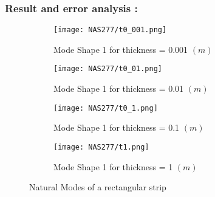 \documentclass[VM.tex]{subfiles}
\begin{document}
\subsubsection*{Result and error analysis : }
\begin{figure}[h!]
\centering
{}
\end{figure}





\begin{figure}[h!]
\centering
\begin{subfigure}{.8\textwidth}
\texttt{[image: NAS277/t0\_001.png]}
\caption{Mode Shape 1 for thickness = 0.001 $(m)$}
\end{subfigure} \vfill
\begin{subfigure}{.8\textwidth}
\texttt{[image: NAS277/t0\_01.png]}
\caption{Mode Shape 1 for thickness = 0.01 $(m)$}
\end{subfigure}\vfill
\begin{subfigure}{.8\textwidth}
\texttt{[image: NAS277/t0\_1.png]}
\caption{Mode Shape 1 for thickness = 0.1 $(m)$}
\end{subfigure}\vfill
\begin{subfigure}{.8\textwidth}
\texttt{[image: NAS277/t1.png]}
\caption{Mode Shape 1 for thickness = 1 $(m)$}
\end{subfigure} \vfill

\caption{Natural Modes of a rectangular strip}
\end{figure}
\end{document}
